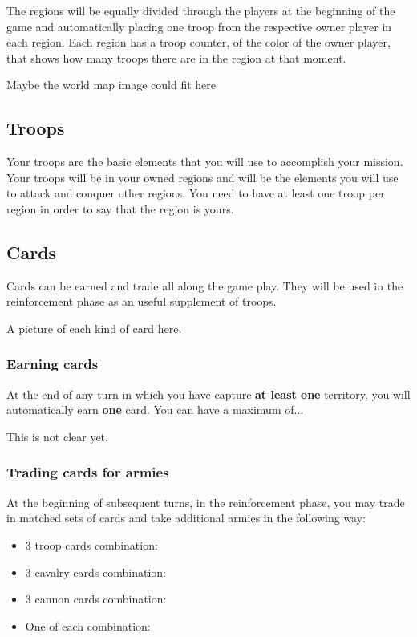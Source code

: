 \documentclass[12pt,a4paper]{article}
\begin{document}
The regions will be equally divided through the players at the beginning of the game and automatically placing one troop from the respective owner player in each region. Each region has a troop counter, of the color of the owner player, that shows how many troops there are in the region at that moment.

\begin{todo}[Alberto]
  Maybe the world map image could fit here
\end{todo}

\subsection{Troops}
Your troops are the basic elements that you will use to accomplish your mission. Your troops will be in your owned regions and will be the elements you will use to attack and conquer other regions. You need to have at least one troop per region in order to say that the region is yours.

\subsection{Cards}
Cards can be earned and trade all along the game play. They will be used in the reinforcement phase as an useful supplement of troops.

\begin{todo}[Alberto]
  A picture of each kind of card here.
\end{todo}

\subsubsection{Earning cards}
At the end of any turn in which you have capture {\bf at least one} territory, you will automatically earn {\bf one} card. You can have a maximum of...

\begin{todo}[Alberto]
  This is not clear yet.
\end{todo}

\subsubsection{Trading cards for armies}
At the beginning of subsequent turns, in the reinforcement phase, you may trade in matched sets of cards and take additional armies in the following way:
 
\begin{itemize}
\item 3 troop cards combination:
\item 3 cavalry cards combination:
\item 3 cannon cards combination:
\item One of each combination:
\end{itemize}
\end{document}
